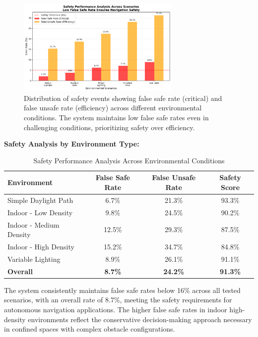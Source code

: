 \documentclass[10pt]{article}
\begin{document}
\begin{figure}[ht]
\centering
\includegraphics[width=0.7\textwidth]{safety_analysis.png}
\caption{Distribution of safety events showing false safe rate (critical) and false unsafe rate (efficiency) across different environmental conditions. The system maintains low false safe rates even in challenging conditions, prioritizing safety over efficiency.}
\label{fig:safety_performance}
\end{figure}

\textbf{Safety Analysis by Environment Type:}

\begin{table}[ht]
\centering
\caption{Safety Performance Analysis Across Environmental Conditions}
\label{tab:safety_analysis}
\begin{tabular}{@{}lccc@{}}
\toprule
\textbf{Environment} & \textbf{False Safe Rate} & \textbf{False Unsafe Rate} & \textbf{Safety Score} \\
\midrule
Simple Daylight Path & 6.7\% & 21.3\% & 93.3\% \\
Indoor - Low Density & 9.8\% & 24.5\% & 90.2\% \\
Indoor - Medium Density & 12.5\% & 29.3\% & 87.5\% \\
Indoor - High Density & 15.2\% & 34.7\% & 84.8\% \\
Variable Lighting & 8.9\% & 26.1\% & 91.1\% \\
\midrule
\textbf{Overall} & \textbf{8.7\%} & \textbf{24.2\%} & \textbf{91.3\%} \\
\bottomrule
\end{tabular}
\end{table}

The system consistently maintains false safe rates below 16\% across all tested scenarios, with an overall rate of 8.7\%, meeting the safety requirements for autonomous navigation applications. The higher false safe rates in indoor high-density environments reflect the conservative decision-making approach necessary in confined spaces with complex obstacle configurations.
\end{document}

